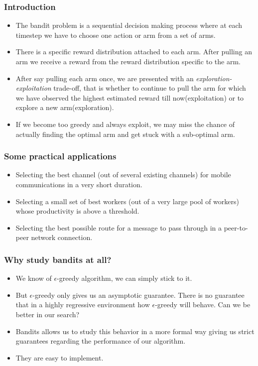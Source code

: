 \begin{frame}
\frametitle{Introduction}
\begin{itemize}
\item<1-> The bandit problem is a sequential decision making process where at each timestep we have to choose one action or arm from a set of arms.
\item<2-> There is a specific reward distribution attached to each arm.  After pulling an arm we receive a reward from the reward distribution specific to the arm. 
\item<3-> After say pulling each arm once, we are presented with an \emph{exploration-exploitation}  trade-off, that is whether to continue to pull the arm for which we have observed the highest estimated reward till now(exploitation) or to explore a new arm(exploration). 
\item<4-> If we become too greedy and always exploit, we may miss the chance of actually finding the optimal arm and get stuck with a sub-optimal arm.
\end{itemize}
\end{frame}

\begin{frame}
\frametitle{Some practical applications}
\begin{itemize}
\item<1-> Selecting the best channel (out of several existing channels) for mobile communications in a very short duration.
\item<2-> Selecting a small set of best workers (out of a very large pool of workers) whose productivity is above a threshold.
\item<3-> Selecting the best possible route for a message to pass through in a peer-to-peer network connection.
\end{itemize}
\end{frame}

\begin{frame}
\frametitle{Why study bandits at all?}
\begin{itemize}
\item<1-> We know of $\epsilon$-greedy \cite{sutton1998reinforcement} algorithm, we can simply stick to it.
\item<2-> But $\epsilon$-greedy only gives us an asymptotic guarantee. There is no guarantee that in a highly regressive environment how $\epsilon$-greedy will behave. Can we be better in our search?
\item<3-> Bandits allows us to study this behavior in a more formal way giving us strict guarantees regarding the performance of our algorithm.
\item<4-> They are easy to implement.    
\end{itemize}
\end{frame}

